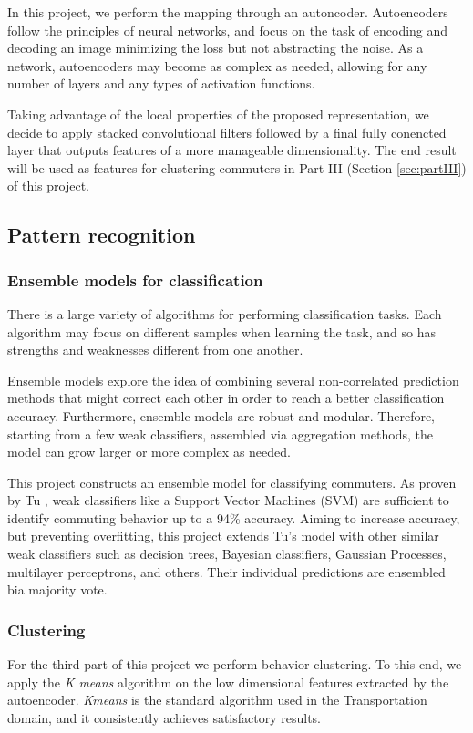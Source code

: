 \documentclass{article}
\begin{document}
In this project, we perform the mapping through an autoncoder. Autoencoders follow the principles of neural networks, and focus on the task of encoding and decoding an image minimizing the loss but not abstracting the noise. As a network, autoencoders may become as complex as needed, allowing for any number of layers and any types of activation functions. 

Taking advantage of the local properties of the proposed representation, we decide to apply stacked convolutional filters followed by a final fully conencted layer that outputs features of a more manageable dimensionality. The end result will be used as features for clustering commuters in Part III (Section \ref{sec:partIII}) of this project. 


\subsection{Pattern recognition}

\subsubsection{Ensemble models for classification}
There is a large variety of algorithms for performing classification tasks. Each algorithm may focus on different samples when learning the task, and so has strengths and weaknesses different from one another. 

Ensemble models explore the idea of combining several non-correlated prediction methods that might correct each other in order to reach a better classification accuracy. Furthermore, ensemble models are robust and modular. Therefore, starting from a few weak classifiers, assembled via aggregation methods, the model can grow larger or more complex as needed.

This project constructs an ensemble model for classifying commuters. As proven by Tu \cite{tu2016impact}, weak classifiers like a Support Vector Machines (SVM) are sufficient to identify commuting behavior up to a 94\% accuracy. Aiming to increase accuracy, but preventing overfitting, this project extends Tu's model with other similar weak classifiers such as decision trees, Bayesian classifiers, Gaussian Processes, multilayer perceptrons, and others. Their individual predictions are ensembled bia majority vote. 

\subsubsection{Clustering} 
For the third part of this project we perform behavior clustering. To this end, we apply the \textit{K means} algorithm on the low dimensional features extracted by the autoencoder. \textit{Kmeans} is the standard algorithm used in the Transportation domain, and it consistently achieves satisfactory results. 
\end{document}
